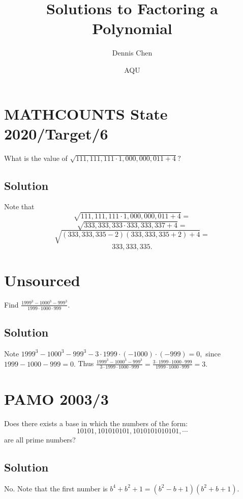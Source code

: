 \documentclass[mast]{lucky}
\title{Solutions to Factoring a Polynomial}
\author{Dennis Chen}
\date{AQU}
\begin{document}
\maketitle

{\hypersetup{
    citecolor=black,
    filecolor=black,
    linkcolor=black,
    urlcolor=black}\tableofcontents
}

\pagebreak\section{MATHCOUNTS State 2020/Target/6}

What is the value of $\sqrt{111,111,111\cdot 1,000,000,011+4}?$

\subsection{Solution}

Note that
\[\sqrt{111,111,111\cdot 1,000,000,011+4}=\]
\[\sqrt{333,333,333\cdot 333,333,337+4}=\]
\[\sqrt{(333,333,335-2)(333,333,335+2)+4}=\]
\[333,333,335.\]

\pagebreak\section{Unsourced}

Find $\frac{1999^3-1000^3-999^3}{1999\cdot 1000\cdot 999}.$

\subsection{Solution}

Note $1999^3-1000^3-999^3-3\cdot 1999\cdot (-1000)\cdot (-999)=0,$ since $1999-1000-999=0.$ Thus $\frac{1999^3-1000^3-999^3}{3\cdot 1999\cdot 1000\cdot 999}=\frac{3\cdot 1999\cdot 1000\cdot 999}{1999\cdot 1000\cdot 999}=3.$

\pagebreak\section{PAMO 2003/3}

Does there exists a base in which the numbers of the form:
\[ 10101, 101010101, 1010101010101,\cdots \]
are all prime numbers?

\subsection{Solution}
No. Note that the first number is $b^4+b^2+1=(b^2-b+1)(b^2+b+1).$
\end{document}
